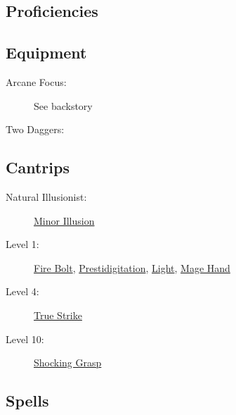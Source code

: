 \documentclass[letterpaper,10pt,twoside,twocolumn,openany]{book}
\begin{document}
\subsection{Proficiencies}

\begin{description}[font=\normalfont\textbf,noitemsep,topsep=1ex,leftmargin=1em]
	\item[Armor:] 
	\item[Weapons:] 
	\item[Tools:] 
\end{description}

\begin{description}[font=\normalfont\textbf,noitemsep,topsep=1ex,leftmargin=1em]
	\item[Saving Throws:] 
	\item[Skills:] 
\end{description}

\subsection{Equipment}

\begin{description}
	\item[Arcane Focus:] See backstory
	\item[Two Daggers:] 
\end{description}

\subsection{Cantrips}

\begin{description}
	\item[Natural Illusionist:] \hyperlink{Minor Illusion}{Minor Illusion}
	\item[Level 1:] \hyperlink{Fire Bolt}{Fire Bolt}, \hyperlink{Prestidigitation}{Prestidigitation}, \hyperlink{Light}{Light}, \hyperlink{Mage Hand}{Mage Hand}
	\item[Level 4:] \hyperlink{True Strike}{True Strike}
	\item[Level 10:] \hyperlink{Shocking Grasp}{Shocking Grasp}
\end{description}

\subsection{Spells}
\end{document}
